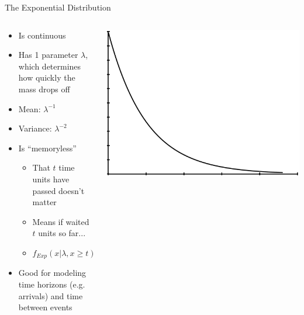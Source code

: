 \documentclass[aspectratio=169]{beamer}
\begin{document}
\begin{frame}{The Exponential Distribution}

\begin{columns}[c]
\begin{column}{0.6\textwidth}
\begin{itemize}
\item Is continuous
\item Has 1 parameter $\lambda$, which determines how quickly the mass drops off
\item Mean: $\lambda^{-1}$
\item Variance: $\lambda^{-2}$
\item Is ``memoryless''
\begin{itemize}
	\item That $t$ time units have passed doesn't matter
	\item Means if waited $t$ units so far...
	\item $f_{Exp} (x | \lambda, x \ge t) = f_{Exp} (x - t | \lambda)$
\end{itemize}
\item Good for modeling time horizons (e.g. arrivals) and time between events
\end{itemize}
\end{column}
\begin{column}{0.4\textwidth}
\includegraphics[width=1\textwidth]{lectModel1/expDistribution.pdf}
\end{column}
\end{columns}
\end{frame}
\end{document}

